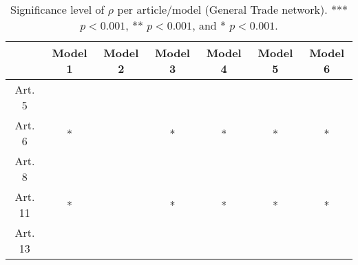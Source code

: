 \begin{table}[ht]
\centering
\begin{tabular}{ccccccc}
  \toprule
 & Model 1 & Model 2 & Model 3 & Model 4 & Model 5 & Model 6 \\ 
  \midrule
Art. 5 &   &   &   &   &   &   \\ 
   \midrule
Art. 6 & * &   & * & * & * & * \\ 
   \midrule
Art. 8 &   &   &   &   &   &   \\ 
   \midrule
Art. 11 & * &   & * & * & * & * \\ 
   \midrule
Art. 13 &   &   &   &   &   &   \\ 
   \bottomrule
\end{tabular}
\caption{Significance level of $\rho$ per article/model (General Trade network). *** $p < 0.001$, ** $p < 0.001$, and * $p < 0.001$.} 
\end{table}
